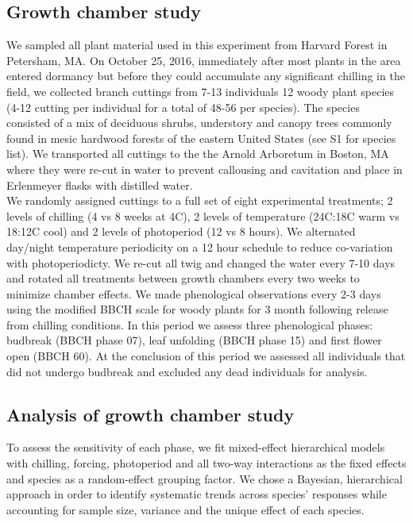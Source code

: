 \documentclass[11pt]{article}
\begin{document}
\subsection*{Growth chamber study}
\noindent We sampled all plant material used in this experiment from Harvard Forest in Petersham, MA. On October 25, 2016, immediately after most plants in the area entered dormancy but before they could accumulate any significant chilling in the field,  we collected branch cuttings from 7-13 individuals 12 woody plant species (4-12 cutting per individual for a total of 48-56 per species). The species consisted of a mix of deciduous shrubs, understory and canopy trees commonly found in mesic hardwood forests of the eastern United States (see S1 for species list). We transported all cuttings to the the Arnold Arboretum in Boston, MA where they were re-cut in water to prevent callousing and cavitation and place in Erlenmeyer flasks with distilled water.\\ %

\noindent We randomly assigned cuttings to a full set of eight experimental treatments; 2 levels of chilling (4 vs 8 weeks at 4\degree C), 2 levels of temperature (24\degree C:18\degree C warm vs 18\degree:12\degree C cool) and 2 levels of photoperiod (12 vs 8 hours). We alternated day/night temperature periodicity on a 12 hour schedule to reduce co-variation with photoperiodicty. We re-cut all twig and changed the water every 7-10 days and rotated all treatments between growth chambers every two weeks to minimize chamber effects. We made phenological observations every 2-3 days using the modified BBCH scale for woody plants \citep{} for 3 month following release from chilling conditions. In this period we assess three phenological phases: budbreak (BBCH phase 07), leaf unfolding (BBCH phase 15) and first flower open (BBCH 60). At the conclusion of this period we assessed all individuals that did not undergo budbreak and excluded any dead individuals for analysis.

\subsection*{Analysis of growth chamber study}
\noindent To assess the sensitivity of each phase, we fit mixed-effect hierarchical models with chilling, forcing, photoperiod and all two-way interactions as the fixed effects and species as a random-effect grouping factor. We chose a Bayesian, hierarchical approach in order to identify systematic trends across species' responses while accounting for sample size, variance and the unique effect of each species.\\
\end{document}
